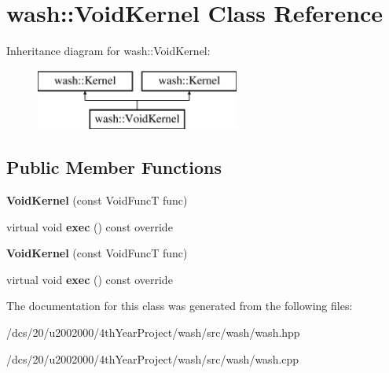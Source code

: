 \hypertarget{classwash_1_1VoidKernel}{}\section{wash\+:\+:Void\+Kernel Class Reference}
\label{classwash_1_1VoidKernel}
Inheritance diagram for wash\+:\+:Void\+Kernel\+:\begin{figure}[H]
\begin{center}
\leavevmode
\includegraphics[height=2.000000cm]{classwash_1_1VoidKernel}
\end{center}
\end{figure}
\subsection*{Public Member Functions}
\begin{DoxyCompactItemize}
\item 
\mbox{\label{classwash_1_1VoidKernel_abe7159c42c48bf15cf3d69dbf09388dc}} 
{\bfseries Void\+Kernel} (const Void\+FuncT func)
\item 
\mbox{\label{classwash_1_1VoidKernel_a2a271788509bac47a96dbbecd7fbe90e}} 
virtual void {\bfseries exec} () const override
\item 
\mbox{\label{classwash_1_1VoidKernel_abe7159c42c48bf15cf3d69dbf09388dc}} 
{\bfseries Void\+Kernel} (const Void\+FuncT func)
\item 
\mbox{\label{classwash_1_1VoidKernel_ab2f530cb8e3322eca2107bab4aa2c4af}} 
virtual void {\bfseries exec} () const override
\end{DoxyCompactItemize}


The documentation for this class was generated from the following files\+:\begin{DoxyCompactItemize}
\item 
/dcs/20/u2002000/4th\+Year\+Project/wash/src/wash/wash.\+hpp\item 
/dcs/20/u2002000/4th\+Year\+Project/wash/src/wash/wash.\+cpp\end{DoxyCompactItemize}

